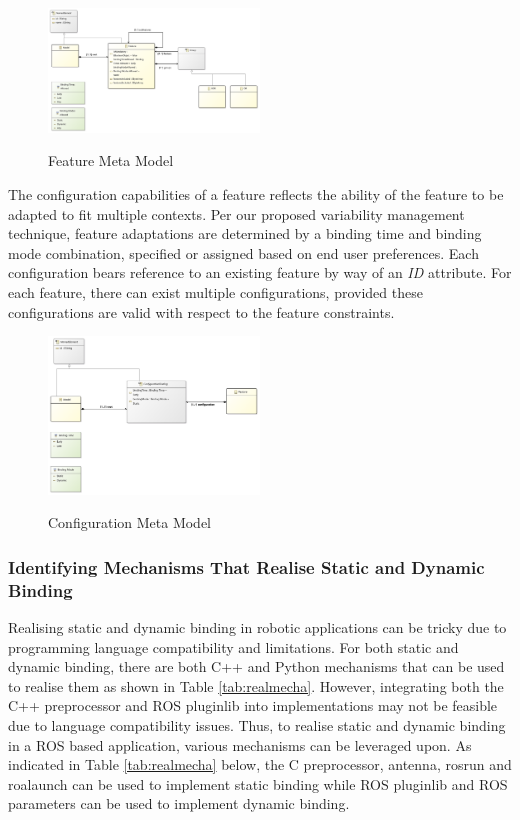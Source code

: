 \documentclass[conference]{IEEEtran}
\begin{document}
\begin{figure}[H]
\caption{Feature Meta Model}
\centering
\includegraphics[width=0.5\textwidth]{diagrams/feature.png}
\label{femet}
\end{figure}

The configuration capabilities of a feature reflects the ability of the feature to be adapted to fit multiple contexts. Per our proposed variability management technique,
feature adaptations are determined by a binding time and binding mode combination, specified or assigned based on end user preferences. Each configuration bears reference to an existing feature by way of an \textit{ID} attribute. For each feature, there can exist multiple configurations, provided these configurations are valid with respect to the feature constraints.

\begin{figure}[H]
\caption{Configuration Meta Model}
\centering
\includegraphics[width=0.5\textwidth]{diagrams/config.png}
\label{conmet}
\end{figure}

\subsubsection{Identifying Mechanisms That Realise Static and Dynamic Binding}
Realising static and dynamic binding in robotic applications can be tricky due to programming language compatibility and limitations. For both static and dynamic binding, there are both C++ and Python mechanisms that can be used to realise them as shown in Table \ref{tab:realmecha}. However, integrating both the C++ preprocessor and ROS pluginlib into implementations may not be feasible due to language compatibility issues. Thus, to realise static and dynamic binding in a ROS based application, various mechanisms can be leveraged upon. As indicated in Table \ref{tab:realmecha} below, the C preprocessor, antenna, rosrun and roalaunch can be used to implement static binding while ROS pluginlib and ROS parameters can be used to implement dynamic binding.
\end{document}
